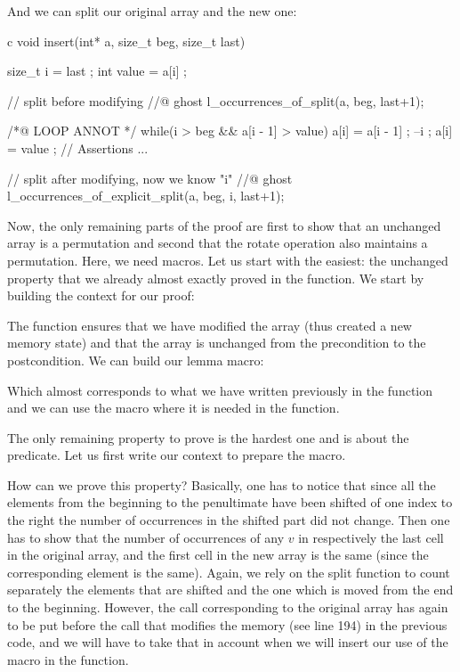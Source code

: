 

And we can split our original array and the new one:


\begin{CodeBlock}{c}
void insert(int* a, size_t beg, size_t last){
  size_t i = last ;
  int value = a[i] ;

  // split before modifying
  //@ ghost l_occurrences_of_split(a, beg, last+1);

  /*@ LOOP ANNOT */
  while(i > beg && a[i - 1] > value){
    a[i] = a[i - 1] ;
    --i ;
  }
  a[i] = value ;
  // Assertions ...

  // split after modifying, now we know "i"
  //@ ghost l_occurrences_of_explicit_split(a, beg, i, last+1);
}
\end{CodeBlock}


Now, the only remaining parts of the proof are first to show that an unchanged
array is a permutation and second that the rotate operation also maintains a
permutation. Here, we need macros. Let us start with the easiest: the unchanged
property that we already almost exactly proved in the
 function. We start by building the context for our
proof:




The function  ensures that we have
modified the array (thus created a new memory state) and that the array is
unchanged from the precondition to the postcondition. We can build our
lemma macro:




Which almost corresponds to what we have written previously in the
 function and we can use the macro where it is needed
in the  function.




The only remaining property to prove is the hardest one and is about the
 predicate. Let us first write our context to prepare
the macro.




How can we prove this property? Basically, one has to notice that since all the
elements from the beginning to the penultimate have been shifted of one index
to the right the number of occurrences in the shifted part did not change. Then
one has to show that the number of occurrences of any $v$ in respectively the
last cell in the original array, and the first cell in the new array is the same
(since the corresponding element is the same). Again, we rely on the split
function to count separately the elements that are shifted and the one which is
moved from the end to the beginning. However, the call corresponding to the
original array has again to be put before the call that modifies the memory (see
line 194) in the previous code, and we will have to take that in account when we
will insert our use of the macro in the  function.


